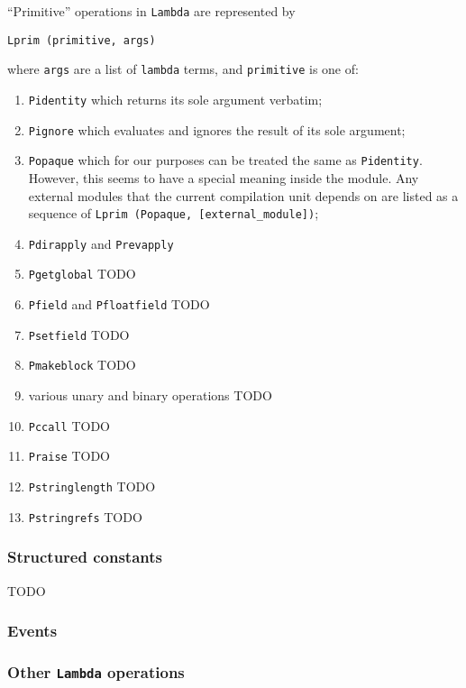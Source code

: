 \documentclass[12pt,a4paper,twoside,openright]{report}
\begin{document}
``Primitive'' operations in \lstinline!Lambda! are represented by
\begin{lstlisting}
Lprim (primitive, args)\end{lstlisting}
where \lstinline!args! are a list of \lstinline!lambda! terms, and \lstinline!primitive! is one of:
\begin{enumerate}
  \item \lstinline!Pidentity! which returns its sole argument verbatim;
  \item \lstinline!Pignore! which evaluates and ignores the result of its sole argument;
  \item \lstinline!Popaque! which for our purposes can be treated the same as
    \lstinline!Pidentity!. However, this seems to have a special meaning inside
    the module. Any external modules that the current compilation unit
    depends on are listed as a sequence of
    \lstinline!Lprim (Popaque, [external_module])!;
  \item \lstinline!Pdirapply! and \lstinline!Prevapply! 
  \item \lstinline!Pgetglobal! TODO
  \item \lstinline!Pfield! and \lstinline!Pfloatfield! TODO
  \item \lstinline!Psetfield! TODO
  \item \lstinline!Pmakeblock! TODO
  \item various unary and binary operations TODO
  \item \lstinline!Pccall! TODO
  \item \lstinline!Praise! TODO
  \item \lstinline!Pstringlength! TODO
  \item \lstinline!Pstringrefs! TODO
\end{enumerate}

\subsubsection{Structured constants}

TODO

\subsubsection{Events}

\subsubsection{Other \texttt{Lambda} operations}
\end{document}

